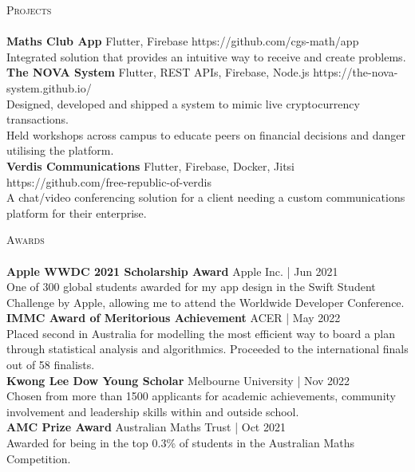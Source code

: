 \documentclass[a4paper]{article}
\newcommand{\lineunder} {
    \vspace*{-8pt} \\
    \hspace*{-18pt} \hrulefill \\
}
\newcommand{\header} [1] {
    {\hspace*{-18pt}\vspace*{6pt} \textsc{#1}}
    \vspace*{-6pt} \lineunder
}
\begin{document}
\header{Projects}
{\textbf{Maths Club App}} {\textsl{\hfill} Flutter, Firebase}  https://github.com/cgs-math/app\\
Integrated solution that provides an intuitive way to receive and create problems.\\
\vspace*{2mm}
{\textbf{The NOVA System}} {\textsl{\hfill} Flutter, REST APIs, Firebase, Node.js}  https://the-nova-system.github.io/\\
Designed, developed and shipped a system to mimic live cryptocurrency transactions.\\
Held workshops across campus to educate peers on financial decisions and danger utilising the platform.\\
\vspace*{2mm}
{\textbf{Verdis Communications}} {\textsl{\hfill} Flutter, Firebase, Docker, Jitsi}  https://github.com/free-republic-of-verdis\\
A chat/video conferencing solution for a client needing a custom communications platform for their enterprise.\\
\vspace*{2mm}

\header{Awards}
\textbf{Apple WWDC 2021 Scholarship Award} \hfill Apple Inc. | Jun 2021\\
One of 300 global students awarded for my app design in the Swift Student Challenge by Apple, allowing me to attend the Worldwide Developer Conference.\\
\vspace*{2mm}
\textbf{IMMC Award of Meritorious Achievement} \hfill ACER | May 2022\\
Placed second in Australia for modelling the most efficient way to board a plan through statistical analysis and algorithmics.
Proceeded to the international finals out of 58 finalists.\\
\vspace*{2mm}
\textbf{Kwong Lee Dow Young Scholar} \hfill Melbourne University | Nov 2022\\
Chosen from more than 1500 applicants for academic achievements, community involvement and leadership skills within and outside school.\\
\vspace*{2mm}
\textbf{AMC Prize Award} \hfill Australian Maths Trust | Oct 2021\\
Awarded for being in the top 0.3\% of students in the Australian Maths Competition.\\
\vspace*{2mm}
\end{document}
